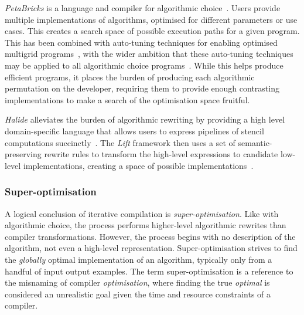\emph{PetaBricks} is a language and compiler for algorithmic choice~\cite{Ansel2009a}. Users provide multiple implementations of algorithms, optimised for different parameters or use cases. This creates a search space of possible execution paths for a given program. This has been combined with auto-tuning techniques for enabling optimised multigrid programs~\cite{Chan2009}, with the wider ambition that these auto-tuning techniques may be applied to all algorithmic choice programs~\cite{Ansel2014}. While this helps produce efficient programs, it places the burden of producing each algorithmic permutation on the developer, requiring them to provide enough contrasting implementations to make a search of the optimisation space fruitful.

\emph{Halide} alleviates the burden of algorithmic rewriting by providing a high level domain-specific language that allows users to express pipelines of stencil computations succinctly~\cite{Ragan-Kelley2013}.
The \emph{Lift} framework then uses a set of semantic-preserving rewrite rules to transform the high-level expressions to candidate low-level implementations, creating a space of possible implementations~\cite{Steuwer2017}.


\subsubsection{Super-optimisation}

A logical conclusion of iterative compilation is \emph{super-optimisation}. Like with algorithmic choice, the process performs higher-level algorithmic rewrites than compiler transformations. However, the process begins with no description of the algorithm, not even a high-level representation. Super-optimisation strives to find the \emph{globally} optimal implementation of an algorithm, typically only from a handful of input output examples. The term super-optimisation is a reference to the misnaming of compiler \emph{optimisation}, where finding the true \emph{optimal} is considered an unrealistic goal given the time and resource constraints of a compiler.

